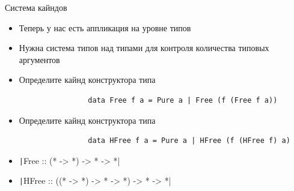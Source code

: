     \begin{frame}[fragile]{Система кайндов}
        \begin{itemize}
            \item Теперь у нас есть аппликация на уровне типов
            \item Нужна система типов над типами для контроля количества типовых аргументов
        \end{itemize}
        \begin{center}
        \end{center}
        \begin{itemize}
            \item[\todo] \pause Определите кайнд конструктора типа
            \begin{verbatim}
                data Free f a = Pure a | Free (f (Free f a))
            \end{verbatim}
            \item[\todo] Определите кайнд конструктора типа
            \begin{verbatim}
                data HFree f a = Pure a | HFree (f (HFree f) a)
            \end{verbatim}
            \item[\answer] \pause \texttt|Free :: (* -> *) -> * -> *|
            \item[\answer] \pause \texttt|HFree :: ((* -> *) -> * -> *) -> * -> *|
        \end{itemize}
    \end{frame}


